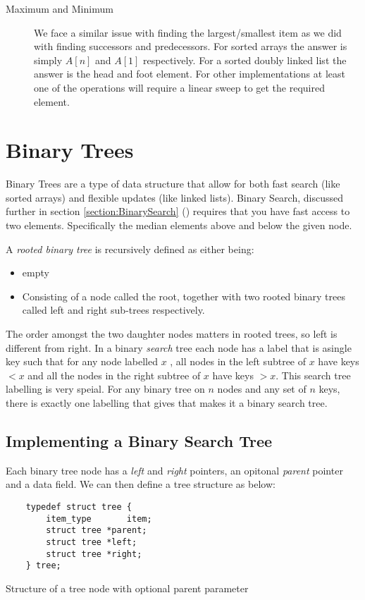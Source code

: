 \begin{description}
		\item[Maximum and Minimum] We face a similar issue with finding the largest/smallest item as we did with finding successors and predecessors. For sorted arrays the answer is simply $A[n]$ and $A[1]$ respectively. For a sorted doubly linked list the answer is the head and foot element. For other implementations at least one of the operations will require a linear sweep to get the required element.
	\end{description}

\section{Binary Trees}
	Binary Trees are a type of data structure that allow for both fast search (like sorted arrays) and flexible updates (like linked lists). Binary Search, discussed further in section \ref{section:BinarySearch} (\pageref{section:BinarySearch}) requires that you have fast access to two elements. Specifically the median elements above and below the given node.

	A \textit{rooted binary tree} is recursively defined as either being:
	\begin{itemize}
		\item empty
		\item Consisting of a node called the root, together with two rooted binary trees called left and right sub-trees respectively.
	\end{itemize}
	The order amongst the two daughter nodes matters in rooted trees, so left is different from right.
	In a binary \textit{search} tree each node has a label that is asingle key such that for any node labelled $x$ , all nodes in the left subtree of $x$ have keys $< x$ and all the nodes in the right subtree of $x$ have keys $> x$. This search tree labelling is very speial. For any binary tree on $n$ nodes and any set of $n$ keys, there is exactly one labelling that gives that makes it a binary search tree.

	\subsection{Implementing a Binary Search Tree}
	Each binary tree node has a \textit{left} and \textit{right} pointers, an opitonal \textit{parent} pointer and a data field. We can then define a tree structure as below:

	\begin{listing}[h]
		\begin{verbatim}
	typedef struct tree {
		item_type		item;
		struct tree *parent;
		struct tree *left;
		struct tree *right;
	} tree;
		\end{verbatim}
		\caption{\label{code:structtree} Structure of a tree node with optional parent parameter}
	\end{listing}

